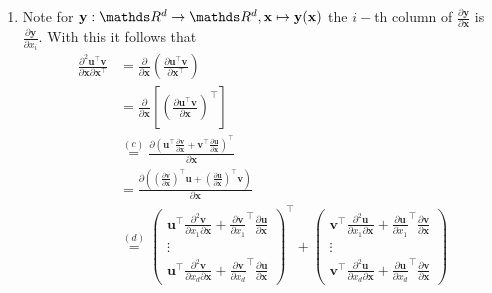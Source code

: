 \documentclass[a4paper]{article}
\begin{document}
{\begin{enumerate}
	\item Note for $\mathbf{y}:\R^d\rightarrow\R^d, \mathbf{x}\mapsto\mathbf{y}(\mathbf{x})$ the $i-$th column of $\frac{\partial\mathbf{y}}{\partial\mathbf{x}}$ is $\frac{\partial\mathbf{y}}{\partial x_i}$.
	  With this it follows that \\
	  \begin{align*}
      \frac{\partial^2 \mathbf{u}^\top \mathbf{v}}{\partial \mathbf{x}\partial\mathbf{x}^\top} &= \frac{\partial}{\partial\mathbf{x}} \left( \frac{\partial \mathbf{u}^\top \mathbf{v}}{\partial\mathbf{x}^\top} \right) \\
      &= \frac{\partial}{\partial\mathbf{x}} \left[ \left( \frac{\partial \mathbf{u}^\top \mathbf{v}}{\partial\mathbf{x}} \right)^\top \right] \\
    &\overset{(c)}{=} \frac{\partial ( \mathbf{u}^\top \frac{\partial  \mathbf{v}}{\partial \mathbf{x}} + \mathbf{v}^\top \frac{\partial  \mathbf{u}}{\partial \mathbf{x}} )^\top}{\partial\mathbf{x}} \\
      &= \frac{\partial \left( \left(\frac{\partial  \mathbf{v}}{\partial \mathbf{x}}\right)^\top \mathbf{u} + \left(\frac{\partial  \mathbf{u}}{\partial \mathbf{x}}\right)^\top \mathbf{v}\right)}{\partial\mathbf{x}} \\
      &\overset{(d)}{=} \begin{pmatrix}
                          \mathbf{u}^\top \frac{\partial^2  \mathbf{v}}{\partial x_1\partial \mathbf{x}} + \frac{\partial\mathbf{v}}{\partial x_1}^\top \frac{\partial  \mathbf{u}}{\partial \mathbf{x}} \\
                          \vdots \\
                          \mathbf{u}^\top \frac{\partial^2  \mathbf{v}}{\partial x_d\partial \mathbf{x}} + \frac{\partial\mathbf{v}}{\partial x_d}^\top \frac{\partial  \mathbf{u}}{\partial \mathbf{x}}
                         \end{pmatrix}^\top
                         +
                         \begin{pmatrix}
                           \mathbf{v}^\top \frac{\partial^2  \mathbf{u}}{\partial x_1\partial \mathbf{x}} + \frac{\partial\mathbf{u}}{\partial x_1}^\top \frac{\partial  \mathbf{v}}{\partial \mathbf{x}} \\
                           \vdots \\
                           \mathbf{v}^\top \frac{\partial^2  \mathbf{u}}{\partial x_d\partial \mathbf{x}} + \frac{\partial\mathbf{u}}{\partial x_d}^\top \frac{\partial  \mathbf{v}}{\partial \mathbf{x}}

\end{pmatrix}
\end{align*}
\end{enumerate}}
\end{document}

